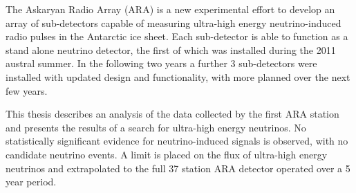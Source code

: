 The Askaryan Radio Array (ARA) is a new experimental effort to develop an array of sub-detectors capable of measuring ultra-high energy neutrino-induced radio pulses in the Antarctic ice sheet. Each sub-detector is able to function as a stand alone neutrino detector, the first of which was installed during the 2011 austral summer. In the following two years a further 3 sub-detectors were installed with updated design and functionality, with more planned over the next few years.

This thesis describes an analysis of the data collected by the first ARA station and presents the results of a search for ultra-high energy neutrinos. No statistically significant evidence for neutrino-induced signals is observed, with no candidate neutrino events. A limit is placed on the flux of ultra-high energy neutrinos and extrapolated to the full 37 station ARA detector operated over a 5 year period.
